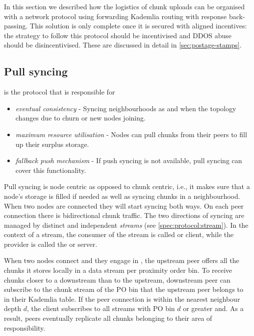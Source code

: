 In this section we described how the logistics of chunk uploads can be organised with a network protocol using forwarding Kademlia routing with response back-passing. This solution is only complete once it is secured with aligned incentives: the strategy to follow this protocol should be incentivised and DDOS abuse should be disincentivised. These are discussed in detail in \ref{sec:postage-stamps}.

\subsection{Pull syncing}\label{sec:pull-syncing}

 is the protocol that is responsible for 

\begin{itemize}
    \item \emph{eventual consistency} - Syncing neighbourhoods as and when the topology changes due to churn or new nodes joining.
    \item \emph{maximum resource utilisation} - Nodes can pull chunks from their peers to fill up their surplus storage. 
    \item \emph{fallback push mechanism} - If push syncing is not available, pull  syncing can cover this functionality.  
\end{itemize}

Pull syncing is node centric as opposed to chunk centric, i.e., it makes sure that a node's  storage is filled if needed as well as syncing chunks in a neighbourhood. When two nodes are connected they will start syncing both ways. On each peer connection there is bidirectional chunk traffic. The two directions of syncing are managed by distinct and independent \emph{streams} (see \ref{spec:protocol:stream}). In the context of a stream, the consumer of the stream is called  or client, while the provider is called the  or server. 

When two nodes connect and they engage in , the upstream peer offers all the chunks it stores locally in a data stream per proximity order bin. To receive chunks closer to a downstream than to the upstream, downstream peer can subscribe to the chunk stream of the PO bin that the upstream peer belongs to in their Kademlia table. If the peer connection is within the nearest neighbour depth $d$, the client subscribes to all streams with PO bin $d$ or  greater and. As a result, peers eventually replicate all chunks belonging to their area of responsibility.

